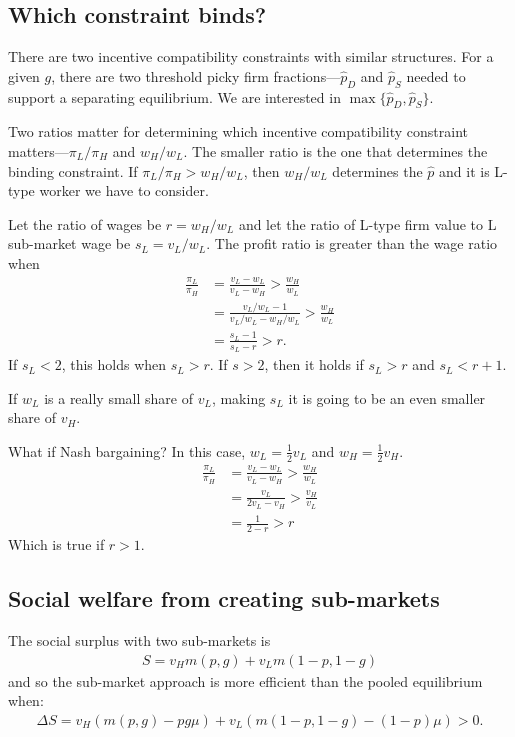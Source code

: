 \documentclass[12pt]{article}
\begin{document}
\subsection{Which constraint binds?}

There are two incentive compatibility constraints with similar structures.
For a given $g$, there are two threshold picky firm fractions---$\hat{p}_D$ and $\hat{p}_S$ needed to support a separating equilibrium.
We are interested in $\max\{\hat{p}_D, \hat{p}_S\}$.

Two ratios matter for determining which incentive compatibility constraint matters---$\pi_L / \pi_H$ and $w_H / w_L$.
The smaller ratio is the one that determines the binding constraint. 
If $\pi_L / \pi_H > w_H / w_L$, then $w_H / w_L$ determines the $\hat{p}$ and it is L-type worker we have to consider.

Let the ratio of wages be $r = w_H / w_L$ and let the ratio of L-type firm value to L sub-market wage be $s_L = v_L/w_L$.
The profit ratio is greater than the wage ratio when 
\begin{align*}
  \frac{\pi_L}{\pi_H} & = \frac{v_L - w_L}{v_L - w_H} > \frac{w_H}{w_L} \\
                      &  = \frac{v_L/w_L - 1}{v_L/w_L - w_H/w_L} > \frac{w_H}{w_L} \\
                      & =  \frac{s_L - 1}{s_L - r} > r.
\end{align*}
If $s_L < 2$, this holds when  $s_L > r$.
If $s > 2$, then it holds if $s_L > r$ and $s_L < r + 1$.

If $w_L$ is a really small share of $v_L$, making $s_L$ it is going to be an even smaller share of $v_H$.

What if Nash bargaining?
In this case, $w_L = \frac{1}{2} v_L$ and  $w_H = \frac{1}{2} v_H$.
\begin{align*} 
  \frac{\pi_L}{\pi_H} & = \frac{v_L - w_L}{v_L - w_H} > \frac{w_H}{w_L} \\
  & = \frac{v_L}{2 v_L - v_H}     > \frac{v_H}{v_L} \\
  & = \frac{1}{2  - r}   >  r
\end{align*}
Which is true if $r > 1$. 

\subsection{Social welfare from creating sub-markets}
The social surplus with two sub-markets is
\begin{align*}
 S = v_H m(p,g) + v_L m(1-p, 1 - g)
\end{align*}
and so the sub-market approach is more efficient than the pooled equilibrium when:
\begin{align*}
  \Delta S = v_H \left(m(p,g) - pg \mu  \right)  + v_L \left( m(1 - p, 1 - g) - (1 - p) \mu \right) > 0.
\end{align*}
\end{document}
